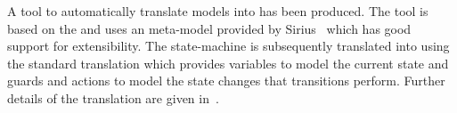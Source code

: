



A tool to automatically translate \SCXML models into \UMLB has been produced. 
The tool is based on the \EMF and uses an \SCXML meta-model provided by Sirius~\cite{siriuswebsite} which has good support for extensibility. 
The \UMLB state-machine is subsequently translated into \EVENTB using the standard \UMLB translation which provides variables to model the current state and guards and actions to model the state changes that transitions perform.
 Further details of the translation are given in~\cite{MoSnHo18,MoSnHo-ABZ2020}.

